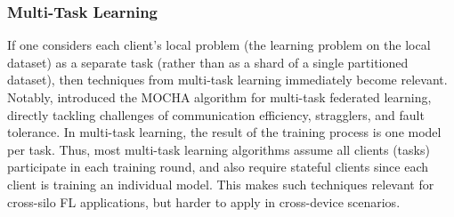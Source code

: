 



\subsubsection{Multi-Task Learning}
\label{sss:multitask-learning}
If one considers each client's local problem (the learning problem on the local dataset) as a separate task (rather than as a shard of a single partitioned dataset), then techniques from multi-task learning \citep{DBLP:journals/corr/ZhangY17aa} immediately become relevant. Notably, \citet{Smith2017} introduced the MOCHA algorithm for multi-task federated learning, directly tackling challenges of communication efficiency, stragglers, and fault tolerance. In multi-task learning, the result of the training process is one model per task. Thus, most multi-task learning algorithms assume all clients (tasks) participate in each training round, and also require stateful clients since each client is training an individual model. This makes such techniques relevant for cross-silo FL applications, but harder to apply in cross-device scenarios.


